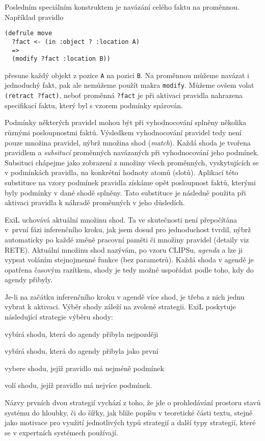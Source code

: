Posledním speciálním konstruktem je navázání celého faktu na proměnnou.
Například pravidlo
\begin{verbatim}
(defrule move
  ?fact <- (in :object ? :location A)
  =>
  (modify ?fact :location B))
\end{verbatim}
přesune každý objekt z pozice \verb|A| na pozici \verb|B|. Na proměnnou
můžeme navázat i jednoduchý fakt, pak ale nemůžeme použít makra \verb|modify|.
Můžeme ovšem volat \verb|(retract ?fact)|, neboť proměnná \verb|?fact| je při
aktivaci pravidla nahrazena specifikací faktu, který byl s vzorem podmínky
spárován.

Podmínky některých pravidel mohou být při vyhodnocování splněny několika různými
posloupnostmi faktů. Výsledkem vyhodnocování pravidel tedy není pouze množina
pravidel, nýbrž množina shod (\emph{match}). Každá shoda je tvořena pravidlem a
\emph{subsitucí} proměnných navázaných při vyhodnocování jeho podmínek.
Subsituci chápejme jako zobrazení z množiny všech proměnných, vyskytujících se v
podmínkách pravidla, na konkrétní hodnoty atomů (slotů). Aplikací této
substituce na vzory podmínek pravidla získáme opět posloupnost faktů, kterými
byly podmínky v dané shodě splněny. Tato substituce je následně použita při
aktivaci pravidla k náhradě proměnných v jeho důsledích.

ExiL uchovává aktuální množinu shod. Ta ve skutečnosti není přepočítána v~první
fázi inferenčního kroku, jak jsem dosud pro jednoduchost tvrdil, nýbrž
automaticky po každé změně pracovní paměti či množiny pravidel (detaily viz
RETE).  Aktuální množinu shod nazývám, po vzoru CLIPSu, \emph{agenda} a lze ji
vypsat voláním stejnojmenné funkce (bez parametrů). Každá shoda v agendě je
opatřena časovým razítkem, shody je tedy možné uspořádat podle toho, kdy do
agendy přibyly.

Je-li na začátku inferenčního kroku v agendě více shod, je třeba z nich jednu
vybrat k aktivaci. Výběr shody záleží na zvolené strategii. ExiL poskytuje
následující strategie výběru shody:
\begin{description}[leftmargin=5cm,style=sameline,align=right,labelsep=0.5cm]
  \item[depth-strategy] vybírá shodu, která do agendy přibyla nejpozději
  \item[breadth-strategy] vybírá shodu, která do agendy přibyla jako první
  \item[simplicity-strategy] vybere shodu, jejíž pravidlo má nejméně podmínek
  \item[complexity-strategy] volí shodu, jejíž pravidlo má nejvíce podmínek.
\end{description}
Názvy prvních dvou strategií vychází z toho, že jde o prohledávání prostoru
stavů systému do hloubky, či do šířky, jak blíže popíšu v teoretické části
textu, stejně jako motivace pro využití jednotlivých typů strategií a další typy
strategií, které se v expertních systémech používají.

